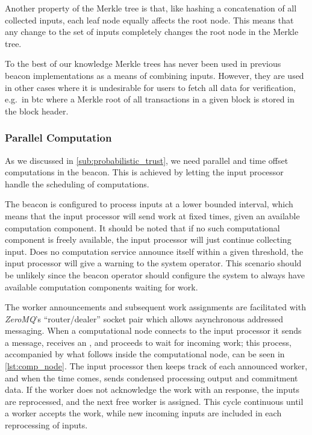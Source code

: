 Another property of the Merkle tree is that, like hashing a concatenation of all collected inputs, each leaf node equally affects the root node.
This means that any change to the set of inputs completely changes the root node in the Merkle tree.

To the best of our knowledge Merkle trees has never been used in previous beacon implementations as a means of combining inputs.
However, they are used in other cases where it is undesirable for users to fetch all data for verification, e.g.\ in \gls{btc} where a Merkle root of all transactions in a given block is stored in the block header.

\subsubsection{Parallel Computation}%
\label{ssub:parallel_computation}
As we discussed in \cref{sub:probabilistic_trust}, we need parallel and time offset computations in the beacon.
This is achieved by letting the input processor handle the scheduling of computations.

The beacon is configured to process inputs at a lower bounded interval, which means that the input processor will send work at fixed times, given an available computation component.
It should be noted that if no such computational component is freely available, the input processor will just continue collecting input.
Does no computation service announce itself within a given threshold, the input processor will give a warning to the system operator.
This scenario should be unlikely since the beacon operator should configure the system to always have available computation components waiting for work.

The worker announcements and subsequent work assignments are facilitated with \textit{ZeroMQ}'s \enquote{router/dealer} socket pair which allows asynchronous addressed messaging.
When a computational node connects to the input processor it sends a  message, receives an , and proceeds to wait for incoming work; this process, accompanied by what follows inside the computational node, can be seen in \cref{lst:comp_node}.
The input processor then keeps track of each announced worker, and when the time comes, sends condensed processing output and commitment data.
If the worker does not acknowledge the work with an  response, the inputs are reprocessed, and the next free worker is assigned.
This cycle continuous until a worker accepts the work, while new incoming inputs are included in each reprocessing of inputs.


